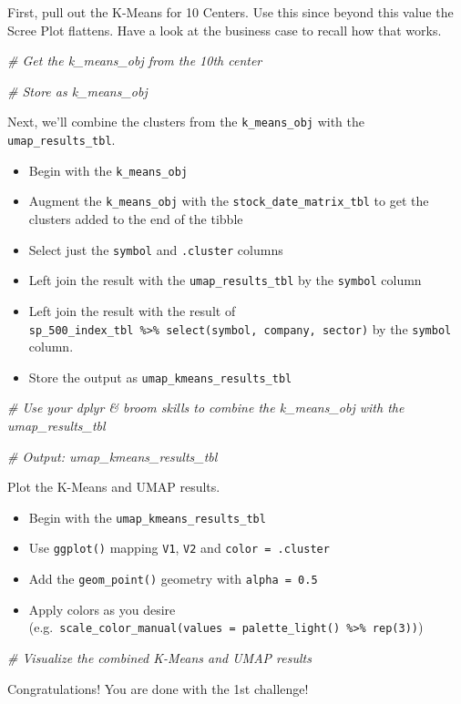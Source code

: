 \documentclass[
]{article}
\newenvironment{Shaded}{\begin{snugshade}}{\end{snugshade}}
\newcommand{\CommentTok}[1]{\textcolor[rgb]{0.56,0.35,0.01}{\textit{#1}}}
\providecommand{\tightlist}{%
  \setlength{\itemsep}{0pt}\setlength{\parskip}{0pt}}
\begin{document}
First, pull out the K-Means for 10 Centers. Use this since beyond this
value the Scree Plot flattens. Have a look at the business case to
recall how that works.

\begin{Shaded}
\begin{Highlighting}[]
\CommentTok{# Get the k_means_obj from the 10th center}

\CommentTok{# Store as k_means_obj}
\end{Highlighting}
\end{Shaded}

Next, we'll combine the clusters from the \texttt{k\_means\_obj} with
the \texttt{umap\_results\_tbl}.

\begin{itemize}
\tightlist
\item
  Begin with the \texttt{k\_means\_obj}
\item
  Augment the \texttt{k\_means\_obj} with the
  \texttt{stock\_date\_matrix\_tbl} to get the clusters added to the end
  of the tibble
\item
  Select just the \texttt{symbol} and \texttt{.cluster} columns
\item
  Left join the result with the \texttt{umap\_results\_tbl} by the
  \texttt{symbol} column
\item
  Left join the result with the result of
  \texttt{sp\_500\_index\_tbl\ \%\textgreater{}\%\ select(symbol,\ company,\ sector)}
  by the \texttt{symbol} column.
\item
  Store the output as \texttt{umap\_kmeans\_results\_tbl}
\end{itemize}

\begin{Shaded}
\begin{Highlighting}[]
\CommentTok{# Use your dplyr & broom skills to combine the k_means_obj with the umap_results_tbl}


\CommentTok{# Output: umap_kmeans_results_tbl }
\end{Highlighting}
\end{Shaded}

Plot the K-Means and UMAP results.

\begin{itemize}
\tightlist
\item
  Begin with the \texttt{umap\_kmeans\_results\_tbl}
\item
  Use \texttt{ggplot()} mapping \texttt{V1}, \texttt{V2} and
  \texttt{color\ =\ .cluster}
\item
  Add the \texttt{geom\_point()} geometry with \texttt{alpha\ =\ 0.5}
\item
  Apply colors as you desire
  (e.g.~\texttt{scale\_color\_manual(values\ =\ palette\_light()\ \%\textgreater{}\%\ rep(3))})
\end{itemize}

\begin{Shaded}
\begin{Highlighting}[]
\CommentTok{# Visualize the combined K-Means and UMAP results}
\end{Highlighting}
\end{Shaded}

Congratulations! You are done with the 1st challenge!
\end{document}
